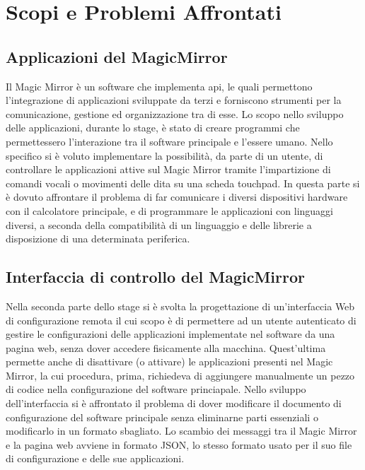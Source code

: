 \chapter{Scopi e Problemi Affrontati}

\section{Applicazioni del MagicMirror}
Il Magic Mirror \`e un software che implementa api, le quali permettono
l'integrazione di applicazioni sviluppate da terzi e forniscono strumenti per la comunicazione, gestione
ed organizzazione tra di esse.
Lo scopo nello sviluppo delle applicazioni, durante lo stage, \`e stato
di creare programmi che permettessero l'interazione tra il software principale
e l'essere umano. Nello specifico si \`e voluto implementare la possibilit\`a, da parte di un utente,
di controllare le applicazioni attive sul Magic Mirror tramite l'impartizione di comandi vocali
o movimenti delle dita su una scheda touchpad.
In questa parte si \`e dovuto affrontare il problema di far comunicare
i diversi dispositivi hardware con il calcolatore principale, e di programmare
le applicazioni con linguaggi diversi, a seconda della compatibilit\`a di un linguaggio
e delle librerie a disposizione di una determinata periferica.
\\[2\baselineskip]
\section{Interfaccia di controllo del MagicMirror}
Nella seconda parte dello stage si \`e svolta la progettazione di un'interfaccia Web di configurazione remota
il cui scopo \`e di permettere ad un utente autenticato di gestire
le configurazioni delle applicazioni implementate nel software da una pagina web,
senza dover accedere fisicamente alla macchina.
Quest'ultima permette anche di disattivare (o attivare) le applicazioni presenti nel Magic Mirror,
la cui procedura, prima, richiedeva di aggiungere manualmente un pezzo di codice nella
configurazione del software princiapale.
Nello sviluppo dell'interfaccia si \`e affrontato il problema di dover modificare
il documento di configurazione del software principale senza eliminarne parti essenziali
o modificarlo in un formato sbagliato.
Lo scambio dei messaggi tra il Magic Mirror e la pagina web avviene in formato JSON, lo stesso formato
usato per il suo file di configurazione e delle sue applicazioni.\\
